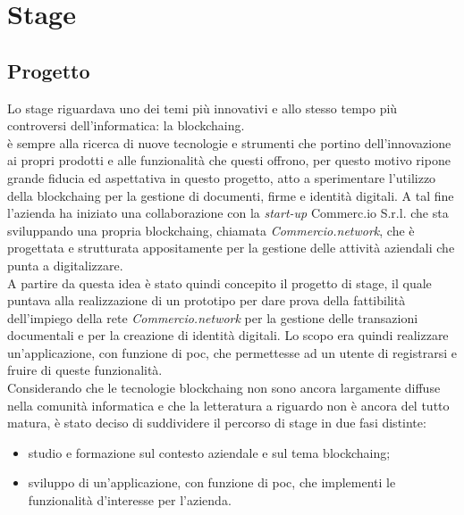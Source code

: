 
\chapter{Stage}
\label{cap:stage}

\section{Progetto}

Lo stage riguardava uno dei temi più innovativi e allo stesso tempo più controversi dell'informatica: la \gls{blockchaing}.\\
\myCompany{} \companyTitle{} è sempre alla ricerca di nuove tecnologie e strumenti che portino dell'innovazione ai propri prodotti e alle funzionalità che questi offrono, per questo motivo ripone grande fiducia ed aspettativa in questo progetto, atto a sperimentare l'utilizzo della \gls{blockchaing} per la gestione di documenti, firme e identità digitali.
A tal fine l'azienda ha iniziato una collaborazione con la \textit{start-up} Commerc.io S.r.l. che sta sviluppando una propria \gls{blockchaing}, chiamata \textit{Commercio.network}, che è progettata e strutturata appositamente per la gestione delle attività aziendali che \myCompany{} \companyTitle{} punta a digitalizzare.\\
A partire da questa idea è stato quindi concepito il progetto di stage, il quale puntava alla realizzazione di un prototipo per dare prova della fattibilità dell'impiego della rete \textit{Commercio.network} per la gestione delle transazioni documentali e per la creazione di identità digitali. Lo scopo era quindi realizzare un'applicazione, con funzione di \gls{poc}, che permettesse ad un utente di registrarsi e fruire di queste funzionalità.\\
Considerando che le tecnologie \gls{blockchaing} non sono ancora largamente diffuse nella comunità informatica e che la letteratura a riguardo non è ancora del tutto matura, è stato deciso di suddividere il percorso di stage in due fasi distinte:

\begin{itemize}
	\item studio e formazione sul contesto aziendale e sul tema \gls{blockchaing};
	\item sviluppo di un'applicazione, con funzione di \gls{poc}, che implementi le funzionalità d'interesse per l'azienda.
\end{itemize}

